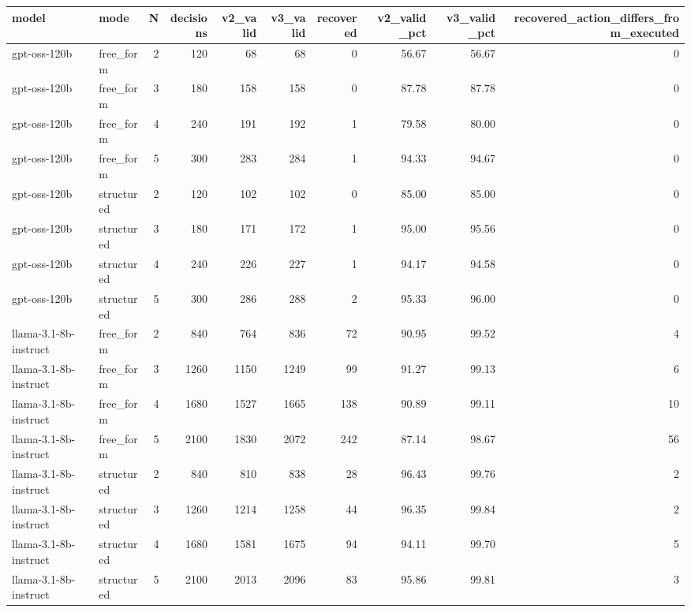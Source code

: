 \begin{tabular}{llrrrrrrrr}
\toprule
model & mode & N & decisions & v2\_valid & v3\_valid & recovered & v2\_valid\_pct & v3\_valid\_pct & recovered\_action\_differs\_from\_executed \\
\midrule
gpt-oss-120b & free\_form & 2 & 120 & 68 & 68 & 0 & 56.67 & 56.67 & 0 \\
gpt-oss-120b & free\_form & 3 & 180 & 158 & 158 & 0 & 87.78 & 87.78 & 0 \\
gpt-oss-120b & free\_form & 4 & 240 & 191 & 192 & 1 & 79.58 & 80.00 & 0 \\
gpt-oss-120b & free\_form & 5 & 300 & 283 & 284 & 1 & 94.33 & 94.67 & 0 \\
gpt-oss-120b & structured & 2 & 120 & 102 & 102 & 0 & 85.00 & 85.00 & 0 \\
gpt-oss-120b & structured & 3 & 180 & 171 & 172 & 1 & 95.00 & 95.56 & 0 \\
gpt-oss-120b & structured & 4 & 240 & 226 & 227 & 1 & 94.17 & 94.58 & 0 \\
gpt-oss-120b & structured & 5 & 300 & 286 & 288 & 2 & 95.33 & 96.00 & 0 \\
llama-3.1-8b-instruct & free\_form & 2 & 840 & 764 & 836 & 72 & 90.95 & 99.52 & 4 \\
llama-3.1-8b-instruct & free\_form & 3 & 1260 & 1150 & 1249 & 99 & 91.27 & 99.13 & 6 \\
llama-3.1-8b-instruct & free\_form & 4 & 1680 & 1527 & 1665 & 138 & 90.89 & 99.11 & 10 \\
llama-3.1-8b-instruct & free\_form & 5 & 2100 & 1830 & 2072 & 242 & 87.14 & 98.67 & 56 \\
llama-3.1-8b-instruct & structured & 2 & 840 & 810 & 838 & 28 & 96.43 & 99.76 & 2 \\
llama-3.1-8b-instruct & structured & 3 & 1260 & 1214 & 1258 & 44 & 96.35 & 99.84 & 2 \\
llama-3.1-8b-instruct & structured & 4 & 1680 & 1581 & 1675 & 94 & 94.11 & 99.70 & 5 \\
llama-3.1-8b-instruct & structured & 5 & 2100 & 2013 & 2096 & 83 & 95.86 & 99.81 & 3 \\
\bottomrule
\end{tabular}
